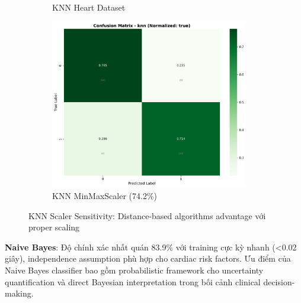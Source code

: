 \begin{figure}[H]
\begin{subfigure}[b]{0.31\textwidth}
\caption{KNN Heart Dataset}
\label{fig:knn_heart_performance}
\end{subfigure}
\hfill
\begin{subfigure}[b]{0.31\textwidth}
\centering
\includegraphics[width=0.95\textwidth]{Result/cleveland_dataset/confusion_matrices/knn_numeric_dataset_MinMaxScaler.png}
\caption{KNN MinMaxScaler (74.2\%)}
\label{fig:knn_minmax_performance}
\end{subfigure}
\caption{KNN Scaler Sensitivity: Distance-based algorithms advantage với proper scaling}
\label{fig:knn_analysis_complete}
\end{figure}

\textbf{Naive Bayes}: Độ chính xác nhất quán 83.9\% với training cực kỳ nhanh (<0.02 giây), independence assumption phù hợp cho cardiac risk factors. Ưu điểm của Naive Bayes classifier bao gồm probabilistic framework cho uncertainty quantification và direct Bayesian interpretation trong bối cảnh clinical decision-making.

